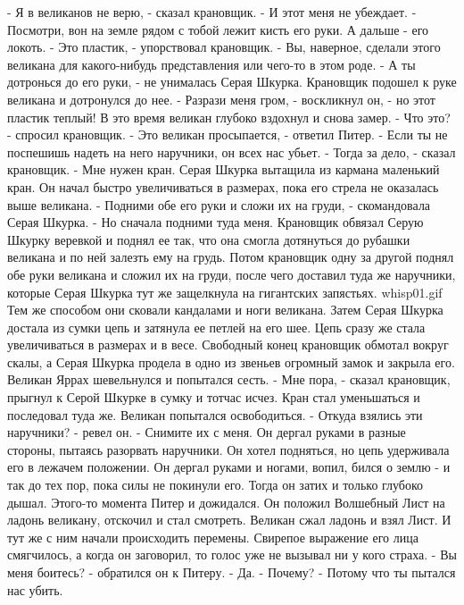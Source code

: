     - Я в великанов не верю, - сказал крановщик. - И этот меня не 
убеждает.
    - Посмотри, вон на земле рядом с тобой лежит кисть его руки. А 
дальше - его локоть.
    - Это пластик, - упорствовал крановщик. - Вы, наверное, сделали 
этого великана для какого-нибудь представления или чего-то в этом 
роде.
    - А ты дотронься до его руки, - не унималась Серая Шкурка.
    Крановщик подошел к руке великана и дотронулся до нее.
    - Разрази меня гром, - воскликнул он, - но этот пластик теплый!
    В это время великан глубоко вздохнул и снова замер.
    - Что это? - спросил крановщик.
    - Это великан просыпается, - ответил Питер. - Если ты не поспешишь 
надеть на него наручники, он всех нас убьет.
    - Тогда за дело, - сказал крановщик. - Мне нужен кран.
    Серая Шкурка вытащила из кармана маленький кран. Он начал быстро 
увеличиваться в размерах, пока его стрела не оказалась выше великана.
    - Подними обе его руки и сложи их на груди, - скомандовала Серая 
Шкурка. - Но сначала подними туда меня.
    Крановщик обвязал Серую Шкурку веревкой и поднял ее так, что она 
смогла дотянуться до рубашки великана и по ней залезть ему на грудь. 
Потом крановщик одну за другой поднял обе руки великана и сложил их на 
груди, после чего доставил туда же наручники, которые Серая Шкурка тут 
же защелкнула на гигантских запястьях.
    {whisp01.gif}
    Тем же способом они сковали кандалами и ноги великана. Затем Серая 
Шкурка достала из сумки цепь и затянула ее петлей на его шее. Цепь 
сразу же стала увеличиваться в размерах и в весе. Свободный конец 
крановщик обмотал вокруг скалы, а Серая Шкурка продела в одно из 
звеньев огромный замок и закрыла его.
    Великан Яррах шевельнулся и попытался сесть.
    - Мне пора, - сказал крановщик, прыгнул к Серой Шкурке в сумку и 
тотчас исчез. Кран стал уменьшаться и последовал туда же.
    Великан попытался освободиться.
    - Откуда взялись эти наручники? - ревел он. - Снимите их с меня.
Он дергал руками в разные стороны, пытаясь разорвать наручники. Он 
хотел подняться, но цепь удерживала его в лежачем положении. Он дергал 
руками и ногами, вопил, бился о землю - и так до тех пор, пока силы не 
покинули его. Тогда он затих и только глубоко дышал.
    Этого-то момента Питер и дожидался. Он положил Волшебный Лист на 
ладонь великану, отскочил и стал смотреть. Великан сжал ладонь и взял 
Лист. И тут же с ним начали происходить перемены. Свирепое выражение 
его лица смягчилось, а когда он заговорил, то голос уже не вызывал ни 
у кого страха.
    - Вы меня боитесь? - обратился он к Питеру.
    - Да.
    - Почему?
    - Потому что ты пытался нас убить.
